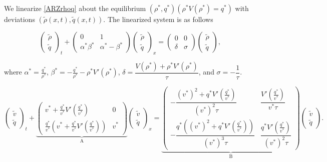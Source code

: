\documentclass[review]{elsarticle}
\begin{document}
We linearize \eqref{ARZrhoq} about the equilibrium $(\rho^*, q^*)(\rho^*V(\rho^*) = q^*)$ with deviations $(\tilde{\rho}(x,t), \tilde{q}(x,t))$. The linearized system is as follows 

\begin{equation} \label{rhoqlin}
\begin{pmatrix}
\tilde{\rho} \\ \tilde{q}
\end{pmatrix}_t
+ \begin{pmatrix}
0 & 1 \\
\alpha^* \beta^* & \alpha^* - \beta^* 
\end{pmatrix}
\begin{pmatrix}
\tilde{\rho} \\ \tilde{q}
\end{pmatrix}_x = 
\begin{pmatrix}
0 & 0 \\
\delta & \sigma
\end{pmatrix}
\begin{pmatrix}
\tilde{\rho} \\ \tilde{q}
\end{pmatrix},
\end{equation}

where $\alpha^* = \frac{q^*}{\rho^*}$, $\beta^* = -\frac{q^*}{\rho^*} - \rho^* V'(\rho^*)$, $\delta = \dfrac{V(\rho^*)+\rho^*V'( \rho^*)}{\tau}$, and $\sigma = -\dfrac{1}{\tau}$.

\begin{equation} \label{vqlin}
\begin{pmatrix}
\tilde{v} \\ \tilde{q}
\end{pmatrix}_t
+ \underbrace{\begin{pmatrix}
v^* + \frac{q^*}{v^*} V'\left(\frac{q^*}{v^*}\right) & 0 \\
\frac{q^*}{v^*} \left( v^* + \frac{q^*}{v^*} V'\left(\frac{q^*}{v^*}\right)\right) & v^*
\end{pmatrix}}_\text{A}
\begin{pmatrix}
\tilde{v} \\ \tilde{q}
\end{pmatrix}_x = 
\underbrace{\begin{pmatrix}
-\dfrac{(v^*)^2+q^*V'\left(\frac{q^*}{v^*}\right)}{(v^*)^2 \tau} & \dfrac{V'\left(\frac{q^*}{v^*}\right)}{v^* \tau} \\
-\dfrac{q^*\left((v^*)^2 + q^*V'\left(\frac{q^*}{v^*}\right)\right)}{(v^*)^3 \tau}  & \dfrac{q^*V'\left(\frac{q^*}{v^*}\right)}{(v^*)^2 \tau}
\end{pmatrix}}_\text{B}
\begin{pmatrix}
\tilde{v} \\ \tilde{q}
\end{pmatrix}.
\end{equation}
\end{document}
